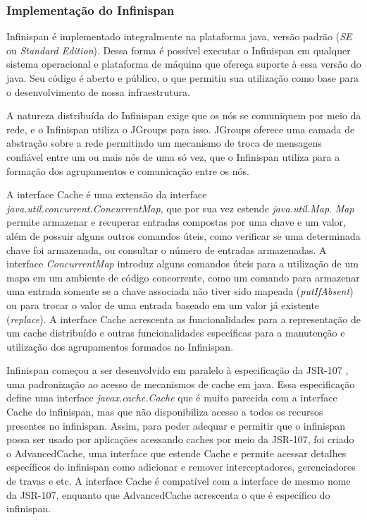 \documentclass[11pt,twoside,a4paper]{book}
\begin{document}
\subsubsection{Implementação do Infinispan}
\label{sec:implementacao_infinispan}
Infinispan é implementado integralmente na plataforma java, versão padrão (\emph{SE} ou \emph{Standard Edition}). Dessa forma é possível executar o Infinispan em qualquer sistema operacional e plataforma de máquina que ofereça suporte à essa versão do java. Seu código é aberto e público, o que permitiu sua utilização como base para o desenvolvimento de nossa infraestrutura.

A natureza distribuída do Infinispan exige que os nós se comuniquem por meio da rede, e o Infinispan utiliza o JGroups \cite{jgroups} para isso. JGroups oferece uma camada de abstração sobre a rede permitindo um mecanismo de troca de mensagens confiável entre um ou mais nós de uma só vez, que o Infinispan utiliza para a formação dos agrupamentos e comunicação entre os nós.

A interface Cache é uma extensão da interface \emph{java.util.concurrent.ConcurrentMap}, que por sua vez estende \emph{java.util.Map}. \emph{Map} permite armazenar e recuperar entradas compostas por uma chave e um valor, além de possuir alguns outros comandos úteis, como verificar se uma determinada chave foi armazenada, ou consultar o número de entradas armazenadas. A interface \emph{ConcurrentMap} introduz alguns comandos úteis para a utilização de um mapa em um ambiente de código concorrente, como um comando para armazenar uma entrada somente se a chave associada não tiver sido mapeada (\emph{putIfAbsent}) ou para trocar o valor de uma entrada baseado em um valor já existente (\emph{replace}). A interface Cache acrescenta as funcionalidades para a representação de um cache distribuído e outras funcionalidades específicas para a manutenção e utilização dos agrupamentos formados no Infinispan.

Infinispan começou a ser desenvolvido em paralelo à especificação da JSR-107 \cite{jsr107}, uma padronização ao acesso de mecanismos de cache em java. Essa especificação define uma interface \emph{javax.cache.Cache} que é muito parecida com a interface Cache do infinispan, mas que não disponibiliza acesso a todos os recursos presentes no infinispan. Assim, para poder adequar e permitir que o infinispan possa ser usado por aplicações acessando caches por meio da JSR-107, foi criado o AdvancedCache, uma interface que estende Cache e permite acessar detalhes específicos do infinispan como adicionar e remover interceptadores, gerenciadores de travas e etc. A interface Cache é compatível com a interface de mesmo nome da JSR-107, enquanto que AdvancedCache acrescenta o que é específico do infinispan.
\end{document}

